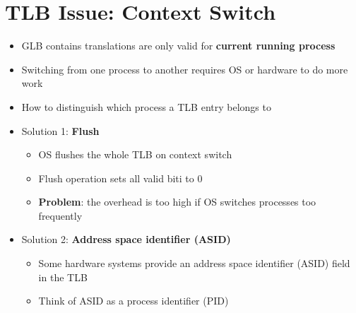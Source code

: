 \documentclass[a4paper,11pt,english]{article}
\begin{document}
\section*{TLB Issue: Context Switch}
\begin{itemize}
    \item GLB contains translations are only valid for \textbf{\color{blue} current running process}
    \item Switching from one process to another requires OS or hardware to do more work
    \item How to distinguish which process a TLB entry belongs to
    \item Solution 1: \textbf{\color{blue} Flush}
        \begin{itemize}
            \item OS flushes the whole TLB on context switch
            \item Flush operation sets all valid biti to 0
            \item \textbf{\color{red} Problem}: the overhead is too high if OS switches processes too frequently
        \end{itemize}
    \item Solution 2: \textbf{\color{blue} Address space identifier (ASID)}
        \begin{itemize}
            \item Some hardware systems provide an address space identifier (ASID) field in the TLB
            \item Think of ASID as a process identifier (PID)
        \end{itemize}
\end{itemize}
\end{document}
